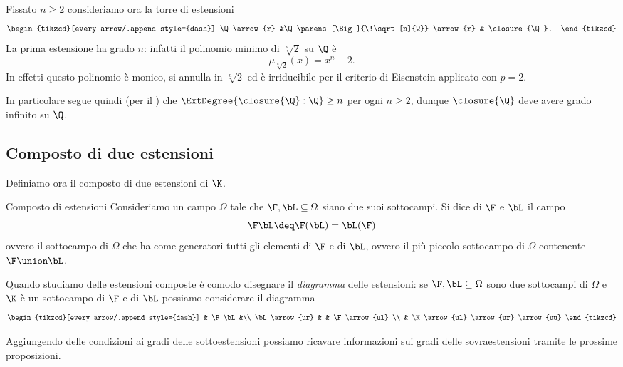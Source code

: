 Fissato $n \geq 2$ consideriamo ora la torre di estensioni \[
    \begin{tikzcd}[every arrow/.append style={dash}]
        \Q \arrow{r} 
        &\Q\parens[\Big]{\!\sqrt[n]{2}} \arrow{r} 
        & \closure{\Q}.
    \end{tikzcd}
\] La prima estensione ha grado $n$: infatti il polinomio minimo di $\!\!\sqrt[n]{2}$ su $\Q$ è \[
    \mu_{\!\!\sqrt[n]{2}}(x) = x^n - 2.
\] In effetti questo polinomio è monico, si annulla in $\!\!\sqrt[n]{2}$ ed è irriducibile per il criterio di Eisenstein applicato con $p = 2$. 

In particolare segue quindi (per il ) che $\ExtDegree{\closure{\Q} : \Q} \geq n$ per ogni $n \geq 2$, dunque $\closure{\Q}$ deve avere grado infinito su $\Q$.   

\subsection{Composto di due estensioni}

Definiamo ora il composto di due estensioni di $\K$.

\begin{definition}{Composto di estensioni}{}
    Consideriamo un campo $\Omega$ tale che $\F, \bL \subseteq \Omega$ siano due suoi sottocampi. Si dice  di $\F$ e $\bL$ il campo \[
        \F\bL \deq \F(\bL) = \bL(\F)
    \] ovvero il sottocampo di $\Omega$ che ha come generatori tutti gli elementi di $\F$ e di $\bL$, ovvero il più piccolo sottocampo di $\Omega$ contenente $\F \union \bL$.  
\end{definition}

Quando studiamo delle estensioni composte è comodo disegnare il \emph{diagramma} delle estensioni: se $\F, \bL \subseteq \Omega$ sono due sottocampi di $\Omega$ e $\K$ è un sottocampo di $\F$ e di $\bL$ possiamo considerare il diagramma  
\begin{equation}
    \label{eq:composite_ext}
    \begin{tikzcd}[every arrow/.append style={dash}]
            & \F\bL &\\
        \bL \arrow{ur}  & & \F \arrow{ul} \\
            & \K \arrow{ul} \arrow{ur} \arrow{uu}
    \end{tikzcd}
\end{equation}

Aggiungendo delle condizioni ai gradi delle sottoestensioni possiamo ricavare informazioni sui gradi delle sovraestensioni tramite le prossime proposizioni.

